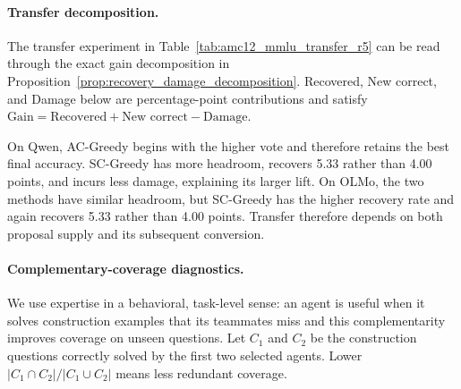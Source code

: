 \paragraph{Transfer decomposition.}
The transfer experiment in Table~\ref{tab:amc12_mmlu_transfer_r5} can be read
through the exact gain decomposition in
Proposition~\ref{prop:recovery_damage_decomposition}.
Recovered, New correct, and Damage below are percentage-point contributions and
satisfy $\text{Gain}=\text{Recovered}+\text{New correct}-\text{Damage}$.

\begin{table}[H]
\centering
\caption{AMC12-to-MMLU-Redux transfer decomposition. Recovery rate is
conditional on R0 headroom; the contribution columns are unconditional
percentage points.}
\label{tab:transfer_decomposition}
\small
{}
\end{table}

On Qwen, AC-Greedy begins with the higher vote and therefore retains the best
final accuracy. SC-Greedy has more headroom, recovers 5.33 rather than 4.00
points, and incurs less damage, explaining its larger lift. On OLMo, the two
methods have similar headroom, but SC-Greedy has the higher recovery rate and
again recovers 5.33 rather than 4.00 points. Transfer therefore depends on both
proposal supply and its subsequent conversion.

\paragraph{Complementary-coverage diagnostics.}
We use expertise in a behavioral, task-level sense: an agent is useful when it
solves construction examples that its teammates miss and this complementarity
improves coverage on unseen questions. Let $C_1$ and $C_2$ be the construction
questions correctly solved by the first two selected agents. Lower
$|C_1\cap C_2|/|C_1\cup C_2|$ means less redundant coverage.

